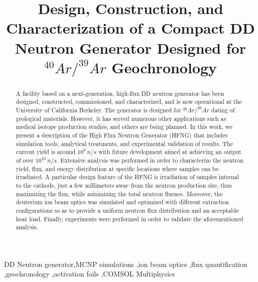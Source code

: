 \documentclass[review]{elsarticle}
\begin{document}
	
	\begin{frontmatter}
		
	\title{Design, Construction, and Characterization of a Compact DD Neutron Generator Designed for $^{40}Ar/^{39}Ar$ Geochronology}

	
\begin{abstract}
	
A facility based on a next-generation, high-flux DD neutron generator has been designed, constructed, commissioned, and characterized, and is now operational at the University of California Berkeley. The generator is designed for $^{40}Ar/^{39}Ar$ dating of geological materials. However, it has served numerous other applications such as medical isotope production studies, and others are being planned. In this work, we present a description of the High Flux Neutron Generator (HFNG) that includes simulation tools, analytical treatments, and experimental validation of results. The current yield is around $10^9\ n/s$ with future development aimed at achieving an output of over $10^{10}\ n/s$. Extensive analysis was performed in order to characterize the neutron yield, flux, and energy distribution at specific locations where samples can be irradiated. A particular design feature of the HFNG is irradiation of samples internal to the cathode, just a few millimeters away from the neutron production site, thus maximizing the flux, while minimizing the total neutron fluence. Moreover, the deuterium ion beam optics was simulated and optimized with different extraction configurations so as to provide a uniform neutron flux distribution and an acceptable heat load. Finally, experiments were performed in order to validate the aforementioned analysis.   
		
\end{abstract}
		
	\begin{keyword}
		DD Neutron generator\sep MCNP simulations \sep ion beam optics \sep flux quantification \sep geochronology \sep activation foils \sep COMSOL Multiphysics
	\end{keyword}
	
\end{frontmatter}
	
\end{document}
